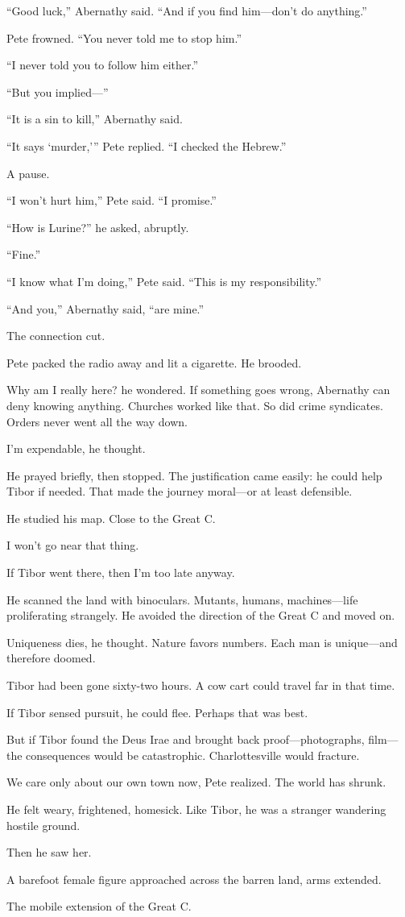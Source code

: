 “Good luck,” Abernathy said. “And if you find him—don’t do anything.”

Pete frowned. “You never told me to stop him.”

“I never told you to follow him either.”

“But you implied—”

“It is a sin to kill,” Abernathy said.

“It says ‘murder,’” Pete replied. “I checked the Hebrew.”

A pause.

“I won’t hurt him,” Pete said. “I promise.”

“How is Lurine?” he asked, abruptly.

“Fine.”

“I know what I’m doing,” Pete said. “This is my responsibility.”

“And you,” Abernathy said, “are mine.”

The connection cut.

Pete packed the radio away and lit a cigarette. He brooded.

Why am I really here? he wondered. If something goes wrong, Abernathy can deny knowing anything. Churches worked like that. So did crime syndicates. Orders never went all the way down.

I’m expendable, he thought.

He prayed briefly, then stopped. The justification came easily: he could help Tibor if needed. That made the journey moral—or at least defensible.

He studied his map. Close to the Great C.

I won’t go near that thing.

If Tibor went there, then I’m too late anyway.

He scanned the land with binoculars. Mutants, humans, machines—life proliferating strangely. He avoided the direction of the Great C and moved on.

Uniqueness dies, he thought. Nature favors numbers. Each man is unique—and therefore doomed.

Tibor had been gone sixty-two hours. A cow cart could travel far in that time.

If Tibor sensed pursuit, he could flee. Perhaps that was best.

But if Tibor found the Deus Irae and brought back proof—photographs, film—the consequences would be catastrophic. Charlottesville would fracture.

We care only about our own town now, Pete realized. The world has shrunk.

He felt weary, frightened, homesick. Like Tibor, he was a stranger wandering hostile ground.

Then he saw her.

A barefoot female figure approached across the barren land, arms extended.

The mobile extension of the Great C.


